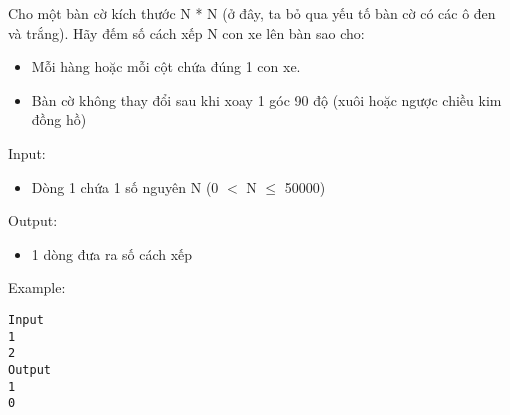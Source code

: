 

Cho một bàn cờ kích thước N * N (ở đây, ta bỏ qua yếu tố bàn cờ có các ô đen và trắng). Hãy đếm số cách xếp N con xe lên bàn sao cho:
\begin{itemize}
	\item Mỗi hàng hoặc mỗi cột chứa đúng 1 con xe.
	\item Bàn cờ không thay đổi sau khi xoay 1 góc 90 độ (xuôi hoặc ngược chiều kim đồng hồ)
\end{itemize}

Input:
\begin{itemize}
	\item 

Dòng 1 chứa 1 số nguyên N (0 $<$ N  $\le$  50000)
\end{itemize}

Output:
\begin{itemize}
	\item 

1 dòng đưa ra số cách xếp
\end{itemize}

Example:
\begin{verbatim}
Input
1
2
Output
1
0 \end{verbatim}
